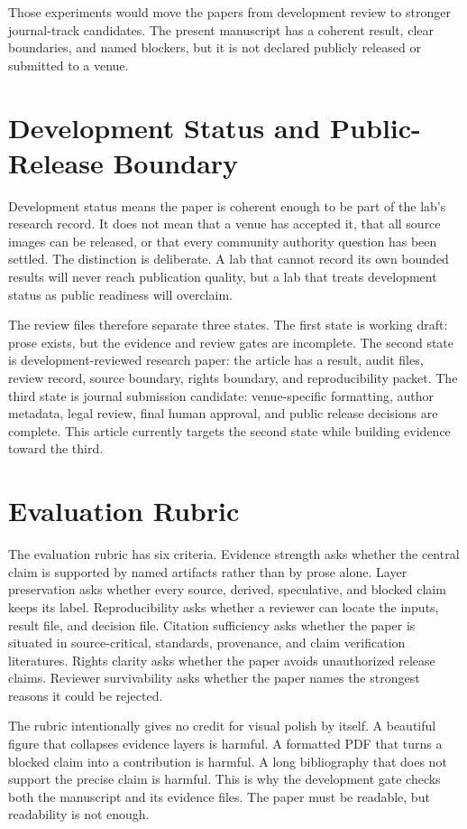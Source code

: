 \documentclass[sigconf,nonacm]{acmart}
\begin{document}
Those experiments would move the papers from development review to stronger
journal-track candidates. The present manuscript has a coherent result, clear
boundaries, and named blockers, but it is not declared publicly released or
submitted to a venue.

\section{Development Status and Public-Release Boundary}
Development status means the paper is coherent enough to be part of the lab's
research record. It does not mean that a venue has accepted it, that all source
images can be released, or that every community authority question has been
settled. The distinction is deliberate. A lab that cannot record its own bounded
results will never reach publication quality, but a lab that treats development
status as public readiness will overclaim.

The review files therefore separate three states. The first state is working
draft: prose exists, but the evidence and review gates are incomplete. The
second state is development-reviewed research paper: the article has a result,
audit files, review record, source boundary, rights boundary, and
reproducibility packet. The third state is journal submission candidate:
venue-specific formatting, author metadata, legal review, final human approval,
and public release decisions are complete. This article currently targets the
second state while building evidence toward the third.

\section{Evaluation Rubric}
The evaluation rubric has six criteria. Evidence strength asks whether the
central claim is supported by named artifacts rather than by prose alone.
Layer preservation asks whether every source, derived, speculative, and blocked
claim keeps its label. Reproducibility asks whether a reviewer can locate the
inputs, result file, and decision file. Citation sufficiency asks whether the
paper is situated in source-critical, standards, provenance, and claim
verification literatures. Rights clarity asks whether the paper avoids
unauthorized release claims. Reviewer survivability asks whether the paper names
the strongest reasons it could be rejected.

The rubric intentionally gives no credit for visual polish by itself. A
beautiful figure that collapses evidence layers is harmful. A formatted PDF that
turns a blocked claim into a contribution is harmful. A long bibliography that
does not support the precise claim is harmful. This is why the development gate
checks both the manuscript and its evidence files. The paper must be readable,
but readability is not enough.
\end{document}
